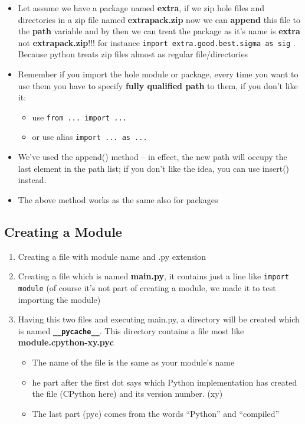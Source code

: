 \documentclass[11pt]{article}
\begin{document}
\begin{itemize}
\item Let assume we have a package named \textbf{extra}, if we zip hole files and
directories in a zip file named \textbf{extrapack.zip} now we can \textbf{append}
this file to the \textbf{path} variable and by then we can treat the
package as it's name is \textbf{extra} not \textbf{extrapack.zip}!!! for instance
\texttt{import extra.good.best.sigma as sig} . Because python treats zip
files almost as regular file/directories
\item Remember if you import the hole module or package, every time you
want to use them you have to specify \textbf{fully qualified path} to them,
if you don't like it: 
\begin{itemize}
\item use \texttt{from ... import ...}
\item or use alias \texttt{import ... as ...}
\end{itemize}
\item We’ve used the append() method – in effect, the new path will occupy
the last element in the path list; if you don’t like the idea, you can
use insert() instead.
\item The above method works as the same also for packages

\newpage
\end{itemize}
\subsection{Creating a Module}
\label{sec:org4173d8b}
\begin{enumerate}
\item Creating a file with module name and .py extension
\item Creating a file which is named \textbf{main.py}, it contains just a line
like \texttt{import module} (of course it's not part of creating a module,
we made it to test importing the module)
\item Having this two files and executing main.py, a directory will be
created which is named \textbf{\texttt{\_\_pycache\_\_}}. This directory contains a
file most like \textbf{module.cpython-xy.pyc}
\begin{itemize}
\item The name of the file is the same as your module’s name
\item he part after the first dot says which Python implementation has
created the file (CPython here) and its version number. (xy)
\item The last part (pyc) comes from the words “Python” and “compiled”
\end{itemize}
\end{enumerate}
\end{document}
